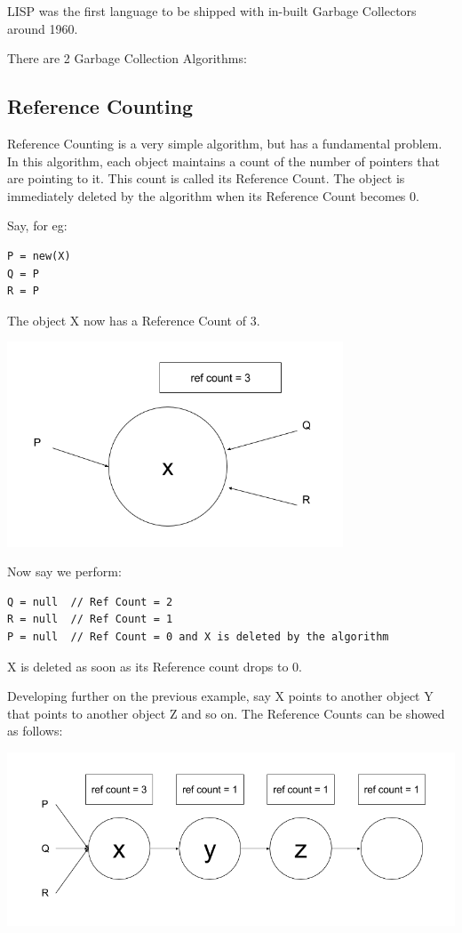 \documentclass[twoside]{article}
\begin{document}
LISP was the first language to be shipped with in-built Garbage Collectors around 1960.

There are 2 Garbage Collection Algorithms:

\subsection{Reference Counting}

Reference Counting is a very simple algorithm, but has a fundamental problem. In this algorithm, each object maintains a count of the number of pointers that are pointing to it. This count is called its Reference Count. The object is immediately deleted by the algorithm when its Reference Count becomes 0.

Say, for eg:

\begin{lstlisting}
P = new(X)
Q = P
R = P
\end{lstlisting}

The object X now has a Reference Count of 3.

\includegraphics[width=100mm,scale=0.5]{1.png}

Now say we perform:

\begin{lstlisting}
Q = null  // Ref Count = 2
R = null  // Ref Count = 1
P = null  // Ref Count = 0 and X is deleted by the algorithm
\end{lstlisting}

X is deleted as soon as its Reference count drops to 0.

Developing further on the previous example, say X points to another object Y that points to another object Z and so on. The Reference Counts can be showed as follows:

\includegraphics[width=150mm,scale=0.5]{2.png}
\end{document}
